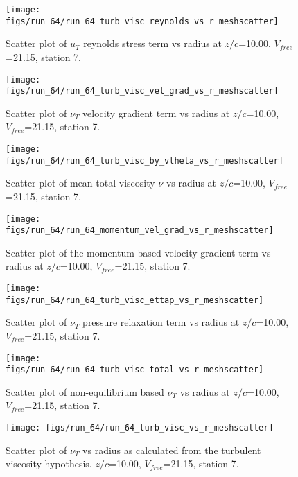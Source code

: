 \begin{figure}[H]
\centering
\texttt{[image: figs/run\_64/run\_64\_turb\_visc\_reynolds\_vs\_r\_meshscatter]}
\caption{Scatter plot of $
u_T$ reynolds stress term vs radius at $z/c$=10.00, $V_{free}$=21.15, station 7.}
\end{figure}


\begin{figure}[H]
\centering
\texttt{[image: figs/run\_64/run\_64\_turb\_visc\_vel\_grad\_vs\_r\_meshscatter]}
\caption{Scatter plot of $\nu_T$ velocity gradient term vs radius at $z/c$=10.00, $V_{free}$=21.15, station 7.}
\end{figure}


\begin{figure}[H]
\centering
\texttt{[image: figs/run\_64/run\_64\_turb\_visc\_by\_vtheta\_vs\_r\_meshscatter]}
\caption{Scatter plot of mean total viscosity $\nu$ vs radius at $z/c$=10.00, $V_{free}$=21.15, station 7.}
\end{figure}


\begin{figure}[H]
\centering
\texttt{[image: figs/run\_64/run\_64\_momentum\_vel\_grad\_vs\_r\_meshscatter]}
\caption{Scatter plot of the momentum based velocity gradient term vs radius at $z/c$=10.00, $V_{free}$=21.15, station 7.}
\end{figure}


\begin{figure}[H]
\centering
\texttt{[image: figs/run\_64/run\_64\_turb\_visc\_ettap\_vs\_r\_meshscatter]}
\caption{Scatter plot of $\nu_T$ pressure relaxation term vs radius at $z/c$=10.00, $V_{free}$=21.15, station 7.}
\end{figure}


\begin{figure}[H]
\centering
\texttt{[image: figs/run\_64/run\_64\_turb\_visc\_total\_vs\_r\_meshscatter]}
\caption{Scatter plot of non-equilibrium based $\nu_T$ vs radius at $z/c$=10.00, $V_{free}$=21.15, station 7.}
\end{figure}


\begin{figure}[H]
\centering
\texttt{[image: figs/run\_64/run\_64\_turb\_visc\_vs\_r\_meshscatter]}
\caption{Scatter plot of $\nu_T$ vs radius as calculated from the turbulent viscosity hypothesis. $z/c$=10.00, $V_{free}$=21.15, station 7.}
\end{figure}


